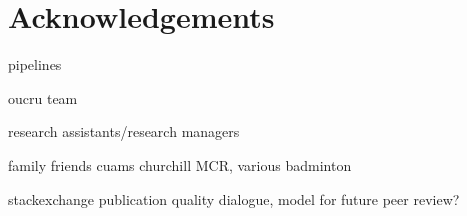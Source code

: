 %
%
\chapter*{Acknowledgements}


pipelines

oucru team

research assistants/research managers

family
friends
cuams
churchill MCR, 
various badminton

stackexchange
    publication quality dialogue, model for future peer review?

